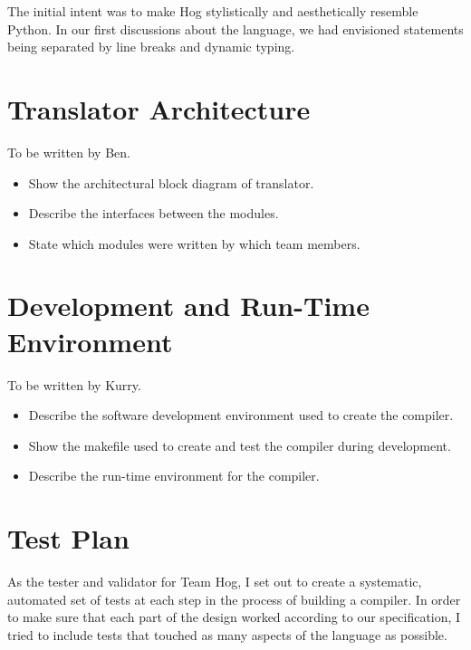 \documentclass{book}
\begin{document}
The initial intent was to make Hog stylistically and aesthetically resemble Python. In our first discussions about the language, we had envisioned statements being separated by line breaks and dynamic typing.

\chapter{Translator Architecture}
\label{chap:trans}

To be written by Ben.

\begin{itemize}
\item Show the architectural block diagram of translator.
\item Describe the interfaces between the modules.
\item State which modules were written by which team members.
\end{itemize}

\chapter{Development and Run-Time Environment}
\label{chap:environ}

To be written by Kurry.

\begin{itemize}
\item Describe the software development environment used to create the compiler.
\item Show the makefile used to create and test the compiler during development.
\item Describe the run-time environment for the compiler.
\end{itemize}

\chapter{Test Plan}
\label{chap:test}

As the tester and validator for Team Hog, I set out to create a systematic, automated set of tests at each step in the process of building a compiler. In order to make sure that each part of the design worked according to our specification, I tried to include tests that touched as many aspects of the language as possible. 
\end{document}
